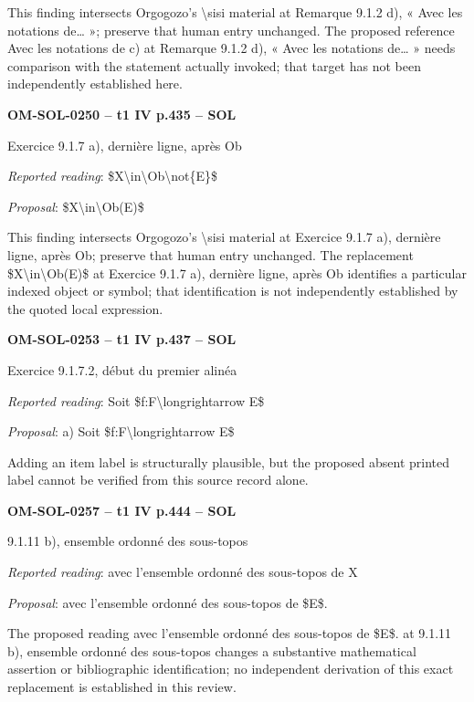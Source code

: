 This finding intersects Orgogozo's \textbackslash{}sisi material at Remarque 9.1.2 d), « Avec les notations de… »; preserve that human entry unchanged. The proposed reference Avec les notations de c) at Remarque 9.1.2 d), « Avec les notations de… » needs comparison with the statement actually invoked; that target has not been independently established here.\par
\par\noindent\textbf{OM-SOL-0250 -- t1 IV p.435 -- SOL}\par
Exercice 9.1.7 a), dernière ligne, après Ob\par
\emph{Reported reading}: \$X\textbackslash{}in\textbackslash{}Ob\textbackslash{}not\{E\}\$\par
\emph{Proposal}: \$X\textbackslash{}in\textbackslash{}Ob(E)\$\par
This finding intersects Orgogozo's \textbackslash{}sisi material at Exercice 9.1.7 a), dernière ligne, après Ob; preserve that human entry unchanged. The replacement \$X\textbackslash{}in\textbackslash{}Ob(E)\$ at Exercice 9.1.7 a), dernière ligne, après Ob identifies a particular indexed object or symbol; that identification is not independently established by the quoted local expression.\par
\par\noindent\textbf{OM-SOL-0253 -- t1 IV p.437 -- SOL}\par
Exercice 9.1.7.2, début du premier alinéa\par
\emph{Reported reading}: Soit \$f:F\textbackslash{}longrightarrow E\$\par
\emph{Proposal}: a) Soit \$f:F\textbackslash{}longrightarrow E\$\par
Adding an item label is structurally plausible, but the proposed absent printed label cannot be verified from this source record alone.\par
\par\noindent\textbf{OM-SOL-0257 -- t1 IV p.444 -- SOL}\par
9.1.11 b), ensemble ordonné des sous-topos\par
\emph{Reported reading}: avec l'ensemble ordonné des sous-topos de X\par
\emph{Proposal}: avec l'ensemble ordonné des sous-topos de \$E\$.\par
The proposed reading avec l'ensemble ordonné des sous-topos de \$E\$. at 9.1.11 b), ensemble ordonné des sous-topos changes a substantive mathematical assertion or bibliographic identification; no independent derivation of this exact replacement is established in this review.\par
